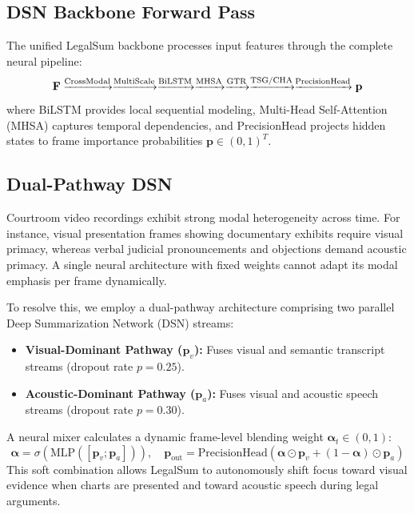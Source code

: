 \documentclass[letterpaper]{article}
\begin{document}
\subsection{DSN Backbone Forward Pass}

The unified LegalSum backbone processes input features through the complete neural pipeline:
\begin{equation}
\small
\mathbf{F} \xrightarrow{\text{CrossModal}} \xrightarrow{\text{MultiScale}}
\xrightarrow{\text{BiLSTM}} \xrightarrow{\text{MHSA}} \xrightarrow{\text{GTR}}
\xrightarrow{\text{TSG/CHA}} \xrightarrow{\text{PrecisionHead}} \mathbf{p}
\end{equation}
where BiLSTM provides local sequential modeling, Multi-Head Self-Attention (MHSA) captures temporal dependencies, and PrecisionHead projects hidden states to frame importance probabilities $\mathbf{p} \in (0,1)^T$.

\subsection{Dual-Pathway DSN}

Courtroom video recordings exhibit strong modal heterogeneity across time. For instance, visual presentation frames showing documentary exhibits require visual primacy, whereas verbal judicial pronouncements and objections demand acoustic primacy. A single neural architecture with fixed weights cannot adapt its modal emphasis per frame dynamically.

To resolve this, we employ a dual-pathway architecture comprising two parallel Deep Summarization Network (DSN) streams:
\begin{itemize}
\item \textbf{Visual-Dominant Pathway ($\mathbf{p}_v$):} Fuses visual and semantic transcript streams (dropout rate $p=0.25$).
\item \textbf{Acoustic-Dominant Pathway ($\mathbf{p}_a$):} Fuses visual and acoustic speech streams (dropout rate $p=0.30$).
\end{itemize}

A neural mixer calculates a dynamic frame-level blending weight $\boldsymbol{\alpha}_t \in (0,1)$:
\begin{equation}
\boldsymbol{\alpha} = \sigma(\text{MLP}([\mathbf{p}_v;\mathbf{p}_a])), \quad
\mathbf{p}_{\text{out}} = \text{PrecisionHead}(\boldsymbol{\alpha} \odot \mathbf{p}_v + (1-\boldsymbol{\alpha}) \odot \mathbf{p}_a)
\end{equation}
This soft combination allows LegalSum to autonomously shift focus toward visual evidence when charts are presented and toward acoustic speech during legal arguments.
\end{document}
